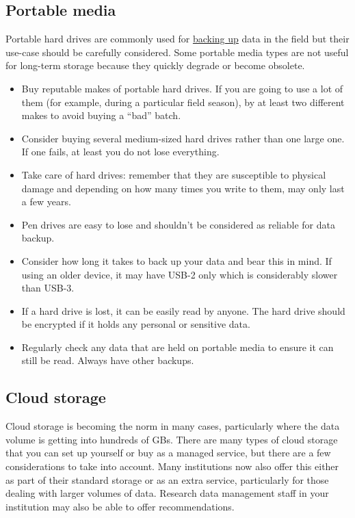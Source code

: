 \documentclass[a4paper,oneside]{report}
\providecommand{\tightlist}{%
  \setlength{\itemsep}{0pt}\setlength{\parskip}{0pt}}
\begin{document}
\hypertarget{portable-media}{%
\subsection{Portable media}\label{portable-media}}

Portable hard drives are commonly used for
\protect\hyperlink{data-backup}{backing up} data in the field but their
use-case should be carefully considered. Some portable media types are
not useful for long-term storage because they quickly degrade or become
obsolete.

\begin{itemize}
\tightlist
\item
  Buy reputable makes of portable hard drives. If you are going to use a
  lot of them (for example, during a particular field season), by at
  least two different makes to avoid buying a ``bad'' batch.
\item
  Consider buying several medium-sized hard drives rather than one large
  one. If one fails, at least you do not lose everything.
\item
  Take care of hard drives: remember that they are susceptible to
  physical damage and depending on how many times you write to them, may
  only last a few years.
\item
  Pen drives are easy to lose and shouldn't be considered as reliable
  for data backup.
\item
  Consider how long it takes to back up your data and bear this in mind.
  If using an older device, it may have USB-2 only which is considerably
  slower than USB-3.
\item
  If a hard drive is lost, it can be easily read by anyone. The hard
  drive should be encrypted if it holds any personal or sensitive data.
\item
  Regularly check any data that are held on portable media to ensure it
  can still be read. Always have other backups.
\end{itemize}

\hypertarget{cloud-storage}{%
\subsection{Cloud storage}\label{cloud-storage}}

Cloud storage is becoming the norm in many cases, particularly where the
data volume is getting into hundreds of GBs. There are many types of
cloud storage that you can set up yourself or buy as a managed service,
but there are a few considerations to take into account. Many
institutions now also offer this either as part of their standard
storage or as an extra service, particularly for those dealing with
larger volumes of data. Research data management staff in your
institution may also be able to offer recommendations.
\end{document}
